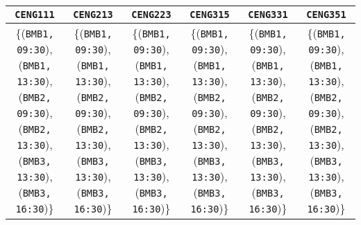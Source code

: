 \documentclass[12pt]{article}
\begin{document}
\begin{itemize}
\begin{table}[H]
\centering
\label{my-label1}
\begin{tabular}{|c|c|c|c|c|c|}
\hline
\texttt{CENG111} & \texttt{CENG213} & \texttt{CENG223} & \texttt{CENG315} & \texttt{CENG331} & \texttt{CENG351}\\ \hline
\tiny\shortstack{\{(\texttt{BMB1, 09:30}),\\ (\texttt{BMB1, 13:30}),\\ (\texttt{BMB2, 09:30}),\\ (\texttt{BMB2, 13:30}),\\ (\texttt{BMB3, 13:30}),\\ (\texttt{BMB3, 16:30})\}} & \tiny\shortstack{\{(\texttt{BMB1, 09:30}),\\ (\texttt{BMB1, 13:30}),\\ (\texttt{BMB2, 09:30}),\\ (\texttt{BMB2, 13:30}),\\ (\texttt{BMB3, 13:30}),\\ (\texttt{BMB3, 16:30})\}} & \tiny\shortstack{\{(\texttt{BMB1, 09:30}),\\ (\texttt{BMB1, 13:30}),\\ (\texttt{BMB2, 09:30}),\\ (\texttt{BMB2, 13:30}),\\ (\texttt{BMB3, 13:30}),\\ (\texttt{BMB3, 16:30})\}} & \tiny\shortstack{\{(\texttt{BMB1, 09:30}),\\ (\texttt{BMB1, 13:30}),\\ (\texttt{BMB2, 09:30}),\\ (\texttt{BMB2, 13:30}),\\ (\texttt{BMB3, 13:30}),\\ (\texttt{BMB3, 16:30})\}} & \tiny\shortstack{\{(\texttt{BMB1, 09:30}),\\ (\texttt{BMB1, 13:30}),\\ (\texttt{BMB2, 09:30}),\\ (\texttt{BMB2, 13:30}),\\ (\texttt{BMB3, 13:30}),\\ (\texttt{BMB3, 16:30})\}} & \tiny\shortstack{\{(\texttt{BMB1, 09:30}),\\ (\texttt{BMB1, 13:30}),\\ (\texttt{BMB2, 09:30}),\\ (\texttt{BMB2, 13:30}),\\ (\texttt{BMB3, 13:30}),\\ (\texttt{BMB3, 16:30})\}}\\ \hline

\end{tabular}
\end{table}
\end{itemize}
\end{document}

